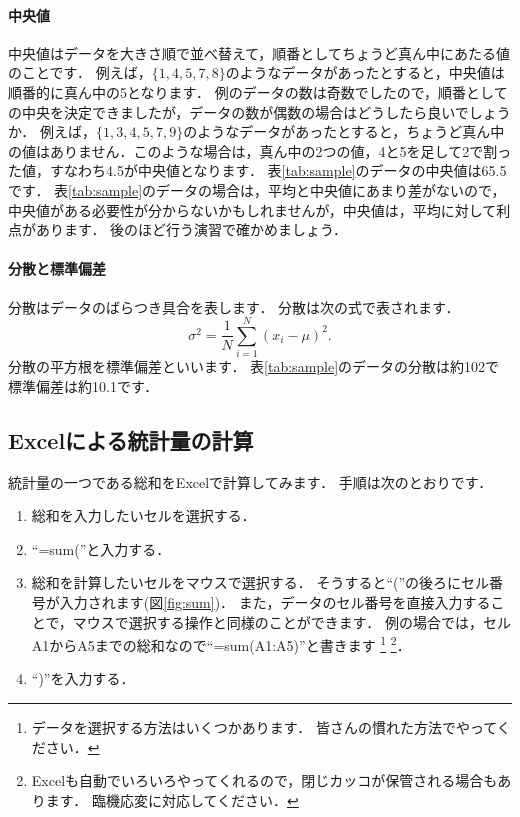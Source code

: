 \paragraph{中央値}
中央値はデータを大きさ順で並べ替えて，順番としてちょうど真ん中にあたる値のことです．
例えば，$\{1, 4, 5, 7, 8\}$のようなデータがあったとすると，中央値は順番的に真ん中の5となります．
例のデータの数は奇数でしたので，順番としての中央を決定できましたが，データの数が偶数の場合はどうしたら良いでしょうか．
例えば，$\{1,3,4,5,7,9\}$のようなデータがあったとすると，ちょうど真ん中の値はありません．このような場合は，真ん中の2つの値，4と5を足して2で割った値，すなわち4.5が中央値となります．
表\ref{tab:sample}のデータの中央値は65.5です．
表\ref{tab:sample}のデータの場合は，平均と中央値にあまり差がないので，中央値がある必要性が分からないかもしれませんが，中央値は，平均に対して利点があります．
後のほど行う演習で確かめましょう．

\paragraph{分散と標準偏差}
分散はデータのばらつき具合を表します．
分散は次の式で表されます．
\begin{equation}
    \sigma^2 = \frac{1}{N} \sum_{i=1}^{N} (x_i - \mu)^2.
\end{equation}
分散の平方根を標準偏差といいます．
表\ref{tab:sample}のデータの分散は約102で標準偏差は約10.1です．


\subsection{Excelによる統計量の計算}

統計量の一つである総和をExcelで計算してみます．
手順は次のとおりです．

\begin{enumerate}
    \item 総和を入力したいセルを選択する．
    \item ``=sum(''と入力する．
    \item 総和を計算したいセルをマウスで選択する．
    そうすると``(''の後ろにセル番号が入力されます(図\ref{fig:sum})．
    また，データのセル番号を直接入力することで，マウスで選択する操作と同様のことができます．
    例の場合では，セルA1からA5までの総和なので``=sum(A1:A5)''と書きます
    \footnote{データを選択する方法はいくつかあります．
      皆さんの慣れた方法でやってください．}
    \footnote{Excelも自動でいろいろやってくれるので，閉じカッコが保管される場合もあります．
      臨機応変に対応してください．}．
    \item ``)''を入力する．
\end{enumerate}

